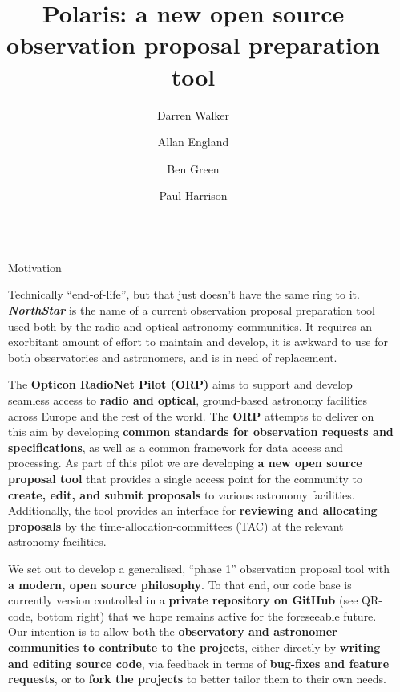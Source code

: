 \documentclass[final]{beamer}
\title{Polaris: a new open source observation proposal preparation tool}
\author{Darren Walker \and Allan England \and Ben Green \and Paul Harrison}
\institute[shortinst]{JCBA, The University of Manchester, UK}
\newlength{\sepwidth}
\newlength{\colwidth}
\newcommand{\separatorcolumn}{\begin{column}{\sepwidth}\end{column}}
\begin{document}
    \begin{frame}[t]
        \begin{columns}[t]
            \separatorcolumn

            \begin{column}{\colwidth}

                \begin{block}{Motivation}

                    Technically ``end-of-life'', but that just doesn't have the same ring to it.
                    \textbf{\emph{NorthStar}} is the name of a current observation proposal preparation tool used both
                    by the radio and optical astronomy communities.
                    It requires an exorbitant amount of effort to maintain and develop, it is awkward to use for both
                    observatories and astronomers, and is in need of replacement.

                    The \textbf{Opticon RadioNet Pilot (ORP)} aims to support and develop seamless access to
                    \textbf{radio and optical}, ground-based astronomy facilities across Europe and the rest of the
                    world.
                    The \textbf{ORP} attempts to deliver on this aim by developing \textbf{common standards for observation
                    requests and specifications}, as well as a common framework for data access and processing.
                    As part of this pilot we are developing \textbf{a new open source proposal tool} that provides a
                    single access point for the community to \textbf{create, edit, and submit proposals} to various
                    astronomy facilities.
                    Additionally, the tool provides an interface for \textbf{reviewing and allocating proposals} by the
                    time-allocation-committees (TAC) at the relevant astronomy facilities.

                    We set out to develop a generalised, ``phase 1'' observation proposal tool with
                    \textbf{a modern, open source philosophy}.
                    To that end, our code base is currently version controlled in a
                    \textbf{private repository on GitHub} (see QR-code, bottom right) that we hope remains active for
                    the foreseeable future.
                    Our intention is to allow both the
                    \textbf{observatory and astronomer communities to contribute to the projects},
                    either directly by \textbf{writing and editing source code}, via feedback in terms of
                    \textbf{bug-fixes and feature requests}, or to \textbf{fork the projects} to better tailor them to
                    their own needs.


\end{block}
\end{column}
\end{columns}
\end{frame}
\end{document}
